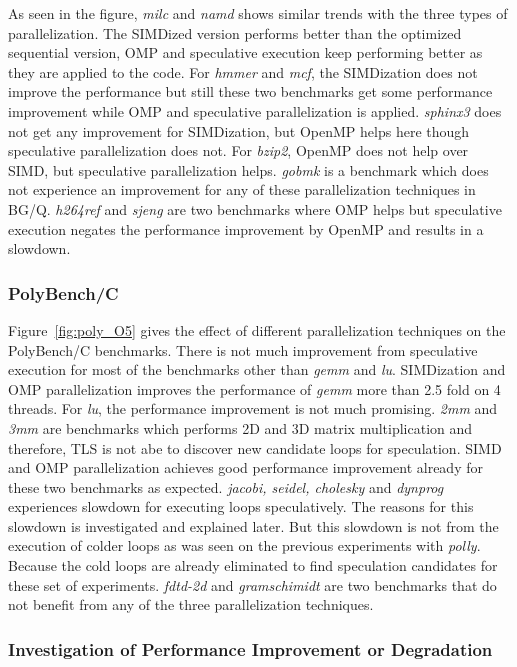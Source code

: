 \documentclass[10pt]{report}          %
\begin{document}
As seen in the figure, \textit{milc} and \textit{namd} shows similar trends with the three types of parallelization.  The SIMDized version performs better than the optimized sequential version, OMP and speculative execution keep performing better as they are applied to the code.  For \textit{hmmer} and \textit{mcf}, the SIMDization does not improve the performance but still these two benchmarks get some performance improvement while OMP and speculative parallelization is applied. \textit{sphinx3} does not get any improvement for SIMDization, but OpenMP helps here though speculative parallelization does not.  For \textit{bzip2}, OpenMP does not help over SIMD, but speculative parallelization helps.  \textit{gobmk} is a benchmark which does not experience an improvement for any of these parallelization techniques in BG/Q. \textit{h264ref} and \textit{sjeng} are two benchmarks where OMP helps but speculative execution negates the performance improvement by OpenMP and results in a slowdown.

\subsubsection{PolyBench/C}

Figure~\ref{fig:poly_O5} gives the effect of different parallelization techniques on the PolyBench/C benchmarks. There is not much improvement from speculative execution for most of the benchmarks other than \textit{gemm} and \textit{lu}. SIMDization and OMP parallelization improves the performance of \textit{gemm} more than 2.5 fold on 4 threads.  For \textit{lu}, the performance improvement is not much promising. \textit{2mm} and \textit{3mm} are benchmarks which performs 2D and 3D matrix multiplication and therefore, TLS is not abe to discover new candidate loops for speculation.  SIMD and OMP parallelization achieves good performance improvement already for these two benchmarks as expected. \textit{ jacobi, seidel, cholesky} and \textit{dynprog} experiences slowdown for executing loops speculatively.  The reasons for this slowdown is investigated and explained later.  But this slowdown is not from the execution of colder loops as was seen on the previous experiments with \textit{polly}.  Because the cold loops are already eliminated to find speculation candidates for these set of experiments.  \textit{fdtd-2d} and \textit{gramschimidt} are two benchmarks that do not benefit from any of the three parallelization techniques.

\subsubsection{Investigation of Performance Improvement or Degradation}
\end{document}
